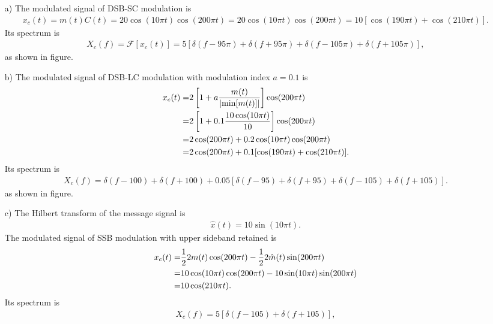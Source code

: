 \documentclass{assignment}
\begin{document}
\begin{sol}
    \begin{itemize}
        \item[a)] The modulated signal of DSB-SC modulation is
        \begin{align}
            x_c(t)=m(t)C(t)=20\cos(10\pi t)\cos(200\pi t)=20\cos(10\pi t)\cos(200\pi t)=10[\cos(190\pi t)+\cos(210\pi t)].
        \end{align}
        Its spectrum is
        \begin{align}
            X_c(f)=\mathscr{F}[x_c(t)]=5[\delta(f-95\pi)+\delta(f+95\pi)+\delta(f-105\pi)+\delta(f+105\pi)],
        \end{align}
        as shown in figure.
        \item[b)] The modulated signal of DSB-LC modulation with modulation index $a=0.1$ is
        \begin{align}
            \notag x_c(t)=&2\left[1+a\frac{m(t)}{\left\lvert\min[m(t)]\right\rvert}\right]\cos(200\pi t)\\
            \notag=&2\left[1+0.1\frac{10\cos(10\pi t)}{10}\right]\cos(200\pi t)\\
            \notag=&2\cos(200\pi t)+0.2\cos(10\pi t)\cos(200\pi t)\\
            =&2\cos(200\pi t)+0.1[\cos(190\pi t)+\cos(210\pi t)].
        \end{align}
        Its spectrum is
        \begin{align}
            X_c(f)=\delta(f-100)+\delta(f+100)+0.05[\delta(f-95)+\delta(f+95)+\delta(f-105)+\delta(f+105)].
        \end{align}
        as shown in figure.
        \item[c)] The Hilbert transform of the message signal is
        \begin{align}
            \hat{x}(t)=10\sin(10\pi t).
        \end{align}
        The modulated signal of SSB modulation with upper sideband retained is
        \begin{align}
            \notag x_c(t)=&\frac{1}{2}2m(t)\cos(200\pi t)-\frac{1}{2}2\hat{m}(t)\sin(200\pi t)\\
            \notag=&10\cos(10\pi t)\cos(200\pi t)-10\sin(10\pi t)\sin(200\pi t)\\
            =&10\cos(210\pi t).
        \end{align}
        Its spectrum is
        \begin{align}
            X_c(f)=5[\delta(f-105)+\delta(f+105)],

\end{align}
\end{itemize}
\end{sol}
\end{document}
